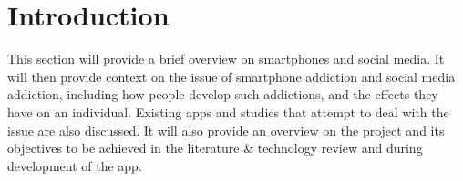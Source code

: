 \documentclass[12pt]{article}
\begin{document}
\begin{table}[H]
\caption[]{List of Abbreviations and Acronyms}
\label{tab:acronym-table}
\end{table}
\newpage


\section{Introduction}
This section will provide a brief overview on smartphones and social media. It will then provide context on the 
issue of smartphone addiction and social media addiction, including how people develop such addictions, and the 
effects they have on an individual. Existing apps and studies that attempt to deal with the issue are also 
discussed. It will also provide an overview on the project and its objectives to be achieved in the literature 
\& technology review and during development of the app.
\end{document}
